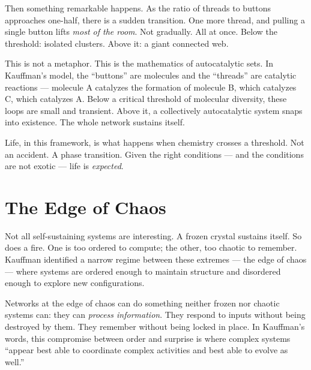 Then something remarkable happens. As the ratio of threads to buttons approaches one-half, there is a sudden transition. One more thread, and pulling a single button lifts \textit{most of the room}. Not gradually. All at once. Below the threshold: isolated clusters. Above it: a giant connected web.

This is not a metaphor. This is the mathematics of autocatalytic sets. In Kauffman's model, the ``buttons'' are molecules and the ``threads'' are catalytic reactions --- molecule A catalyzes the formation of molecule B, which catalyzes C, which catalyzes A\@. Below a critical threshold of molecular diversity, these loops are small and transient. Above it, a collectively autocatalytic system snaps into existence. The whole network sustains itself.

Life, in this framework, is what happens when chemistry crosses a threshold. Not an accident. A phase transition. Given the right conditions --- and the conditions are not exotic --- life is \textit{expected}.

\section*{The Edge of Chaos}
\label{pos13:the-edge-of-chaos}


Not all self-sustaining systems are interesting. A frozen crystal sustains itself. So does a fire. One is too ordered to compute; the other, too chaotic to remember. Kauffman identified a narrow regime between these extremes --- the edge of chaos --- where systems are ordered enough to maintain structure and disordered enough to explore new configurations.


Networks at the edge of chaos can do something neither frozen nor chaotic systems can: they can \textit{process information}. They respond to inputs without being destroyed by them. They remember without being locked in place. In Kauffman's words, this compromise between order and surprise is where complex systems ``appear best able to coordinate complex activities and best able to evolve as well.''

